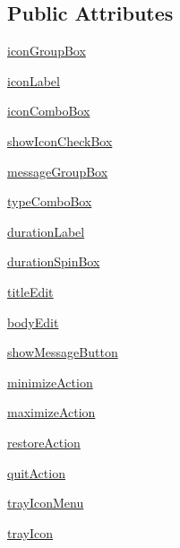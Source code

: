 \subsection*{Public Attributes}
\begin{DoxyCompactItemize}
\item 
\hyperlink{classsystray_1_1Window_a03bcccdc1b96e74d8ebd5f85a397ff2e}{icon\+Group\+Box}
\item 
\hyperlink{classsystray_1_1Window_a985a91804a7b9825fd16e4f0f42cb979}{icon\+Label}
\item 
\hyperlink{classsystray_1_1Window_a00af6965f47729936dc193f02b175871}{icon\+Combo\+Box}
\item 
\hyperlink{classsystray_1_1Window_a7a11f7ce2c9939bce9b6a88c67e982f1}{show\+Icon\+Check\+Box}
\item 
\hyperlink{classsystray_1_1Window_ad65678a536f4e1ec97e3e616703e4e9f}{message\+Group\+Box}
\item 
\hyperlink{classsystray_1_1Window_acc25f2804bb667cc298d8bd79ecf11f4}{type\+Combo\+Box}
\item 
\hyperlink{classsystray_1_1Window_ab992fb790fbc104bd9695ac34280adbe}{duration\+Label}
\item 
\hyperlink{classsystray_1_1Window_ab8194d661a0b85669ebeda8cfcc231bc}{duration\+Spin\+Box}
\item 
\hyperlink{classsystray_1_1Window_acdbbefca05add7afd46a8a61fb8cc61e}{title\+Edit}
\item 
\hyperlink{classsystray_1_1Window_a46f0c975b16163b94ae2a80622300249}{body\+Edit}
\item 
\hyperlink{classsystray_1_1Window_a3c8e1a19eebe94bc9f27a7eecec4e09a}{show\+Message\+Button}
\item 
\hyperlink{classsystray_1_1Window_ad627b4bdae23960d7308514a33989864}{minimize\+Action}
\item 
\hyperlink{classsystray_1_1Window_acfed3927b4b9bf4c7ce28389c6512864}{maximize\+Action}
\item 
\hyperlink{classsystray_1_1Window_adefa9c4067c8c93ec11e6726a5c392cb}{restore\+Action}
\item 
\hyperlink{classsystray_1_1Window_a08c8725d62ed0c54d68116f72ef29340}{quit\+Action}
\item 
\hyperlink{classsystray_1_1Window_afd26bcb87401fc9bc9dd57ff252d18d8}{tray\+Icon\+Menu}
\item 
\hyperlink{classsystray_1_1Window_a63b96ef2dab76784e3ca32b5ae3f5735}{tray\+Icon}
\end{DoxyCompactItemize}


